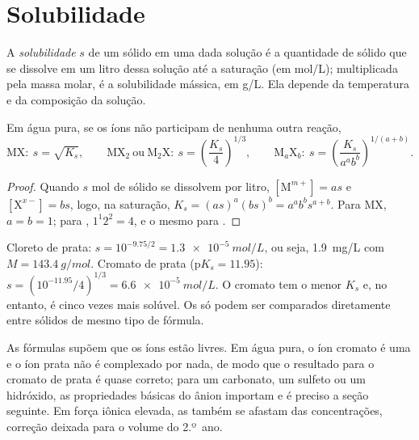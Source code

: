 \section{Solubilidade}

\begin{definition}[Solubilidade]\label{def:b1:precipitation:solubility}
A \emph{solubilidade} $s$ de um sólido em uma dada
solução é a quantidade de sólido que se dissolve em um litro dessa
solução até a saturação (em \unit{mol/L}); multiplicada pela massa molar,
é a solubilidade mássica, em \unit{g/L}. Ela depende da temperatura e da
composição da solução.
\end{definition}

\begin{proposition}\label{prop:b1:precipitation:s-of-ks}
Em água pura, se os íons não participam de nenhuma outra reação,
\[
  \mathrm{MX}:\ s = \sqrt{K_s}, \qquad
  \mathrm{MX_2}\ \text{ou}\ \mathrm{M_2X}:\ s = \left(\frac{K_s}{4}\right)^{1/3},
  \qquad
  \mathrm{M}_a\mathrm{X}_b:\ s = \left(\frac{K_s}{a^a b^b}\right)^{1/(a+b)} .
\]
\end{proposition}

\begin{proof}
Quando $s$ mol de sólido se dissolvem por litro, $[\mathrm{M}^{m+}] = as$ e
$[\mathrm{X}^{x-}] = bs$, logo, na saturação, $K_s = (as)^a(bs)^b =
a^a b^b s^{a+b}$. Para MX, $a = b = 1$; para , $1^1 2^2 = 4$, e o
mesmo para .
\end{proof}

\begin{example}\label{ex:b1:precipitation:agcl-ag2cro4}
Cloreto de prata: $s = 10^{-9.75/2} = \qty{1.3e-5}{mol/L}$, ou seja,
\qty{1.9}{mg/L} com $M = \qty{143.4}{g/mol}$. Cromato de prata 
($\mathrm{p}K_s = 11.95$): $s = (10^{-11.95}/4)^{1/3} =
\qty{6.6e-5}{mol/L}$. O cromato tem o menor $K_s$ e, no entanto, é cinco
vezes mais solúvel. Os  só podem ser comparados
diretamente entre sólidos de mesmo tipo de fórmula.
\end{example}

\begin{remark}
As fórmulas supõem que os íons estão livres. Em água pura, o íon cromato
é uma  e o íon prata não é complexado por nada, de modo que o
resultado para o cromato de prata é quase correto; para um carbonato,
um sulfeto ou um hidróxido, as propriedades básicas do ânion importam e
é preciso a seção seguinte. Em força iônica elevada, as 
também se afastam das concentrações, correção deixada para o volume do
2.º~ano.
\end{remark}

